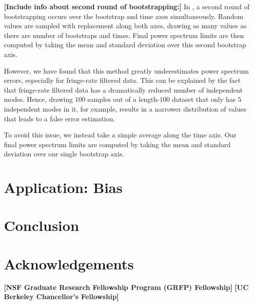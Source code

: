 \documentclass[preprint2,numberedappendix,tighten,twocolappendix]{aastex6}  %
\newcommand{\cc}[1]{{\color{purple} \textbf{[#1]}}}
\begin{document}
\cc{Include info about second round of bootstrapping:}
In \citet{ali_et_al2015}, a second round of bootstrapping occurs over the bootstrap and time axes simultaneously. Random values are sampled with replacement along both axes, drawing as many values as there are number of bootstraps and times. Final power spectrum limits are then computed by taking the mean and standard deviation over this second bootstrap axis. 

However, we have found that this method greatly underestimates power spectrum errors, especially for fringe-rate filtered data. This can be explained by the fact that fringe-rate filtered data has a dramatically reduced number of independent modes. Hence, drawing $100$ samples out of a length-$100$ dataset that only has $5$ independent modes in it, for example, results in a narrower distribution of values that leads to a false error estimation.

To avoid this issue, we instead take a simple average along the time axis. Our final power spectrum limits are computed by taking the mean and standard deviation over our single bootstrap axis. 


\section{Application: Bias}
\label{sec:Bias}


\section{Conclusion}
\label{sec:Con}

\section{Acknowledgements}
\cc{NSF Graduate Research Fellowship Program (GRFP) Fellowship}
\cc{UC Berkeley Chancellor's Fellowship}
\label{sec:Ack}



\end{document}
